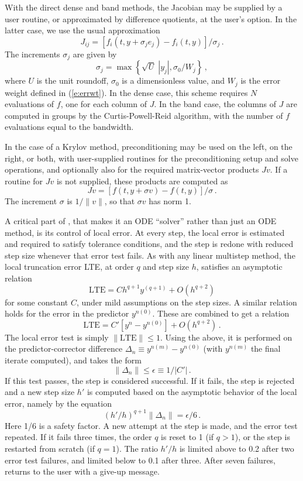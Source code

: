 With the direct dense and band methods, the Jacobian may be supplied
by a user routine, or approximated by difference quotients,
at the user's option.  In the latter case, we use the usual
approximation
\[ J_{ij} = [f_i(t,y+\sigma_j e_j) - f_i(t,y)]/\sigma_j \, . \]
The increments $\sigma_j$ are given by
\[ \sigma_j = \max\left\{\sqrt{U} \; |y_j| , \sigma_0/W_j \right\} \, , \]
where $U$ is the unit roundoff, $\sigma_0$ is a dimensionless value,
and $W_j$ is the error weight defined in (\ref{e:errwt}).  In the dense
case, this scheme requires $N$ evaluations of $f$, one for each column
of $J$.  In the band case, the columns of $J$ are computed in groups
by the Curtis-Powell-Reid algorithm, with the number of $f$ evaluations
equal to the bandwidth.

In the case of a Krylov method, preconditioning may be used on the left, on
the right, or both, with user-supplied routines for the preconditioning
setup and solve operations, and optionally also for the required
matrix-vector products $Jv$.  If a routine for $Jv$ is not supplied,
these products are computed as
\begin{equation}\label{jacobv}
Jv = [f(t,y+\sigma v) - f(t,y)]/\sigma \, . 
\end{equation}
The increment $\sigma$ is $1/\|v\|$, so that $\sigma v$ has norm 1.

A critical part of {\cvodes}, that makes it an ODE ``solver'' rather than
just an ODE method, is its control of local error.  At every step, the
local error is estimated and required to satisfy tolerance conditions,
and the step is redone with reduced step size whenever that error test
fails.  As with any linear multistep method, the local truncation
error LTE, at order $q$ and step size $h$, satisfies an asymptotic
relation
\[ \mbox{LTE} = C h^{q+1} y^{(q+1)} + O(h^{q+2}) \]
for some constant $C$, under mild assumptions on the step sizes.
A similar relation holds for the error in the predictor $y^{n(0)}$.
These are combined to get a relation
\[ \mbox{LTE} = C' [y^n - y^{n(0)}] + O(h^{q+2}) \, . \]
The local error test is simply $\|\mbox{LTE}\| \leq 1$.  Using the above,
it is performed on the predictor-corrector difference 
$\Delta_n \equiv y^{n(m)} - y^{n(0)}$ (with $y^{n(m)}$ the final
iterate computed), and takes the form
\[ \|\Delta_n\| \leq \epsilon \equiv 1/|C'| \, . \]
If this test passes, the step is considered successful.  If it fails,
the step is rejected and a new step size $h'$ is computed based on the
asymptotic behavior of the local error, namely by the equation
\[ (h'/h)^{q+1} \|\Delta_n\| = \epsilon/6 \, . \]
Here 1/6 is a safety factor.  A new attempt at the step is made,
and the error test repeated.  If it fails three times, the order $q$
is reset to 1 (if $q > 1$), or the step is restarted from scratch (if
$q = 1$).  The ratio $h'/h$ is limited above to 0.2 after two error test
failures, and limited below to 0.1 after three.  After seven failures,
{\cvodes} returns to the user with a give-up message.

